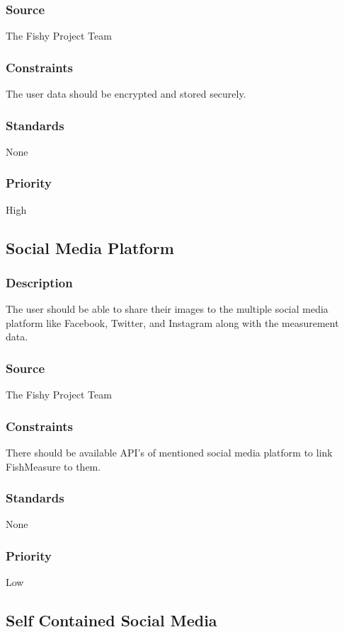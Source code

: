 \subsubsection{Source}
The Fishy Project Team
\subsubsection{Constraints}
The user data should be encrypted and stored securely.
\subsubsection{Standards}
None
\subsubsection{Priority}
High\\

\subsection{Social Media Platform}
\subsubsection{Description}
The user should be able to share their images to the multiple social media platform like Facebook, Twitter, and Instagram along with the measurement data.
\subsubsection{Source}
The Fishy Project Team
\subsubsection{Constraints}
There should be available API's of mentioned social media platform to link FishMeasure to them.
\subsubsection{Standards}
None
\subsubsection{Priority}
Low\\

\subsection{Self Contained Social Media}
